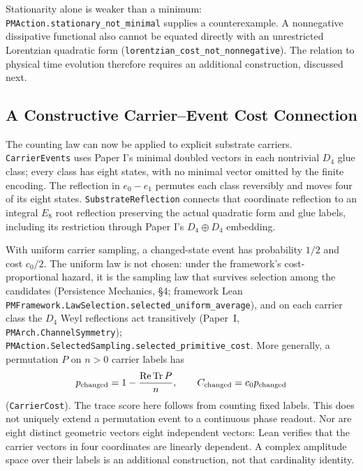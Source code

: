 Stationarity alone is weaker than a minimum: \nolinkurl{PMAction.stationary_not_minimal} supplies a counterexample. A nonnegative dissipative functional also cannot be equated directly with an unrestricted Lorentzian quadratic form (\nolinkurl{lorentzian_cost_not_nonnegative}). The relation to physical time evolution therefore requires an additional construction, discussed next.


\subsection{A Constructive Carrier--Event Cost Connection}
The counting law can now be applied to explicit substrate carriers. \nolinkurl{CarrierEvents}
uses Paper I's minimal doubled vectors in each nontrivial $D_4$ glue class; every class
has eight states, with no minimal vector omitted by the finite encoding. The reflection
in $e_0-e_1$ permutes each class reversibly and moves four of its eight states.
\nolinkurl{SubstrateReflection} connects that coordinate reflection to an integral $E_8$
root reflection preserving the actual quadratic form and glue labels, including its
restriction through Paper I's $D_4\oplus D_4$ embedding.

With uniform carrier sampling, a changed-state event has probability $1/2$
and cost $c_0/2$. The uniform law is not chosen: under the framework's cost-proportional hazard, it is the
sampling law that survives selection among the candidates (Persistence Mechanics, \S4; framework Lean \nolinkurl{PMFramework.LawSelection.selected_uniform_average}),
and on each carrier class the $D_4$ Weyl reflections act transitively (Paper~I,
\nolinkurl{PMArch.ChannelSymmetry}); \nolinkurl{PMAction.SelectedSampling.selected_primitive_cost}. More generally, a permutation $P$ on $n>0$ carrier labels has
\begin{equation}
 p_{\rm changed}=1-\frac{\operatorname{Re}\operatorname{Tr}P}{n},\qquad
 C_{\rm changed}=c_0p_{\rm changed}
\end{equation}
(\nolinkurl{CarrierCost}). The trace score here follows from counting fixed labels.
This does not uniquely extend a permutation event to a continuous phase readout.
Nor are eight distinct geometric vectors eight independent vectors: Lean verifies
that the carrier vectors in four coordinates are linearly dependent. A complex
amplitude space over their labels is an additional construction, not that cardinality identity.

